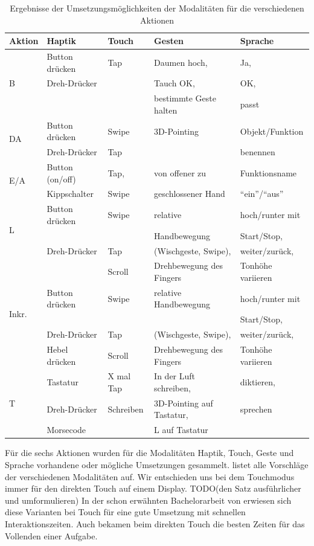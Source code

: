 \begin{table}[ht]
	\centering
	\begin{tabular}{|l|l|l|l|l|}
		\hline
		Aktion & Haptik & Touch & Gesten 			& Sprache\\
		\hline
				\multirow {3}{*}{B}
					& Button drücken		& Tap 				& Daumen hoch, 									& Ja,\\
					& Dreh-Drücker			& 						& Tauch OK, 										& OK,\\
					& 									& 						& bestimmte Geste halten 				& passt\\
		\hline
				\multirow{2}{*}{DA}
					& Button drücken		& Swipe  			& 3D-Pointing 								& Objekt/Funktion \\
					& Dreh-Drücker			& Tap					& 														& benennen \\		
		\hline
				\multirow{2}{*}{E/A}
					& Button (on/off)		& Tap,  			& von offener zu 								& Funktionsname\\
					& Kippschalter			& Swipe				& geschlossener Hand						& "`ein"'/"`aus"'\\
		\hline
				\multirow{3}{*}{L}
					& Button drücken		& Swipe				& relative  										& hoch/runter mit\\
					& 									& 						& Handbewegung									& Start/Stop,\\
					& Dreh-Drücker			& Tap 				& (Wischgeste, Swipe), 					& weiter/zurück,\\
					& 									& Scroll			& Drehbewegung des Fingers 			& Tonhöhe variieren\\		
		\hline
				\multirow{3}{*}{Inkr.}		
					& Button drücken		& Swipe				& relative Handbewegung 				& hoch/runter mit\\
					& 									& 						& 															& Start/Stop,\\
					& Dreh-Drücker			& Tap 				& (Wischgeste, Swipe), 					& weiter/zurück,\\
					& Hebel drücken			& Scroll			& Drehbewegung des Fingers			& Tonhöhe variieren\\					
		\hline
				\multirow{3}{*}{T}
					& Tastatur					& X mal Tap 	& In der Luft schreiben, 				& diktieren,\\
					& Dreh-Drücker			& Schreiben		& 3D-Pointing auf Tastatur,			& sprechen\\		
					& Morsecode					& 						& L auf Tastatur								&  \\	
		\hline			
  \end{tabular}
	\caption{Ergebnisse der Umsetzungsmöglichkeiten der Modalitäten für die verschiedenen Aktionen}
	\label{tab:table1}
\end{table}
Für die sechs Aktionen wurden für die Modalitäten Haptik, Touch, Geste und Sprache vorhandene oder mögliche Umsetzungen gesammelt. 
 listet alle Vorschläge der verschiedenen Modalitäten auf.
Wir entschieden uns bei dem Touchmodus immer für den direkten Touch auf einem Display. TODO(den Satz ausführlicher und umformulieren) 
In der schon erwähnten Bachelorarbeit von \citet{stracke2014touch} erwiesen sich diese Varianten bei Touch für eine gute Umsetzung mit schnellen Interaktionszeiten. 
Auch \citet{Rumelin:2013} bekamen beim direkten Touch die besten Zeiten für das Vollenden einer Aufgabe.

